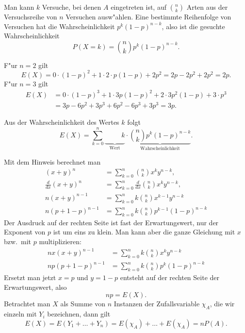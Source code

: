 \begin{loesung}
\begin{teilaufgaben}
\item
Man kann $k$ Versuche, bei denen $A$ eingetreten ist, auf
$\binom{n}{k}$ Arten aus der Versuchsreihe von $n$ Versuchen
ausw"ahlen. Eine bestimmte Reihenfolge von Versuchen hat die
Wahrscheinlichkeit $p^k(1-p)^{n-k}$, also ist die gesuchte
Wahrscheinlichkeit
\[
P(X=k)=\binom{n}{k}p^k(1-p)^{n-k}.
\]
\item
F"ur $n=2$ gilt
\[
E(X)=
0\cdot (1-p)^2+1\cdot 2\cdot p(1-p)+2p^2=2p-2p^2+2p^2=2p.
\]
F"ur $n=3$ gilt
\begin{align*}
E(X)&=0\cdot (1-p)^3+1\cdot 3p(1-p)^2+2\cdot 3p^2(1-p)+3\cdot p^3\\
&=3p-6p^2+3p^3+6p^2-6p^3+3p^3=3p.
\end{align*}
\item
Aus der Wahrscheinlichkeit des Wertes $k$ folgt
\[
E(X)=\sum_{k=0}^n\underbrace{\phantom{\binom{n}{k}}k}_{\text{Wert}}\cdot
\underbrace{\binom{n}{k}p^k(1-p)^{n-k}}_{\text{Wahrscheinlichkeit}}.
\]
\item Mit dem Hinweis berechnet man
\begin{align*}
(x+y)^n&=\sum_{k=0}^n\binom{n}{k}x^ky^{n-k},\\
\frac{d}{dx}
(x+y)^n&= \sum_{k=0}^n \frac{d}{dx} \binom{n}{k}x^ky^{n-k},\\
n(x+y)^{n-1}&=\sum_{k=0}^nk\binom{n}{k}x^{k-1}y^{n-k}\\
n(p+1-p)^{n-1}&=\sum_{k=0}^nk\binom{n}{k}p^{k-1}(1-p)^{n-k}
\end{align*}
Der Ausdruck auf der rechten Seite ist fast der Erwartungswert, nur
der Exponent von $p$ ist um eins zu klein. Man kann aber die ganze
Gleichung mit $x$ bzw.~mit $p$ multiplizieren:
\begin{align*}
nx(x+y)^{n-1}&=\sum_{k=0}^nk\binom{n}{k}x^ky^{n-k}\\
np(p+1-p)^{n-1}&=\sum_{k=0}^nk\binom{n}{k}p^k(1-p)^{n-k}
\end{align*}
Ersetzt man jetzt $x=p$ und $y=1-p$
entsteht auf der rechten
Seite der Erwartungswert, also
\[
np=E(X).
\]
Betrachtet man $X$ als Summe von $n$ Instanzen der Zufallsvariable
$\chi_A$, die wir einzeln mit $Y_i$ bezeichnen, dann gilt
\[
E(X)=E(Y_1+\dots+Y_n)=E(\chi_A)+\dots +E(\chi_A)=nP(A).
\]
\end{teilaufgaben}
\end{loesung}

